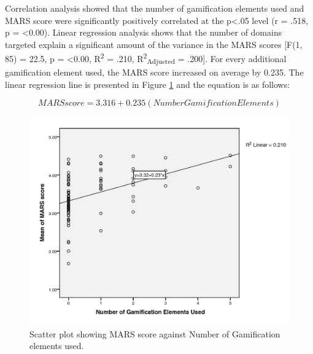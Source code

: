 
Correlation analysis showed that the number of gamification elements used and MARS score were significantly positively correlated at the p\textless.05 level (r = .518, p = \textless0.00). Linear regression analysis shows that the number of domains targeted explain a significant amount of the variance in the MARS scores [F(1, 85) = 22.5, p = \textless0.00, R\textsuperscript{2} = .210, R\textsuperscript{2}\textsubscript{Adjusted} = .200]. For every additional gamification element used, the MARS score increased on average by 0.235. The linear regression line is presented in Figure \ref{fig: gamification-regression} and the equation is as follows:

\begin{equation}
MARSscore = 3.316 + 0.235 \left(NumberGamificationElements\right)
          \label{eq: calc-performance-stars}
\end{equation}

\begin{figure}[h]
    \centering
    \includegraphics[scale=0.40, angle=0]{Files/prevention-study-1/figures/gamification-regression}
    \caption{Scatter plot showing MARS score against Number of Gamification elements used.}
    \label{fig: gamification-regression}
\end{figure}

